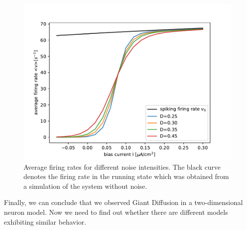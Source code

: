 \documentclass[12pt,a4paper]{article}
\begin{document}
\begin{figure}[H]
	\centering
	\includegraphics[scale=1]{gneur25critsprealfast16alcoarsewstfrealfast9acoarsetf.pdf}\caption{Average firing rates for different noise intensities. The black curve denotes the firing rate in the running state which was obtained from a simulation of the system without noise.}
	\label{rate}
\end{figure}
Finally, we can conclude that we observed Giant Diffusion in a two-dimensional neuron model. Now we need to find out whether there are different models exhibiting similar behavior.
\end{document}
